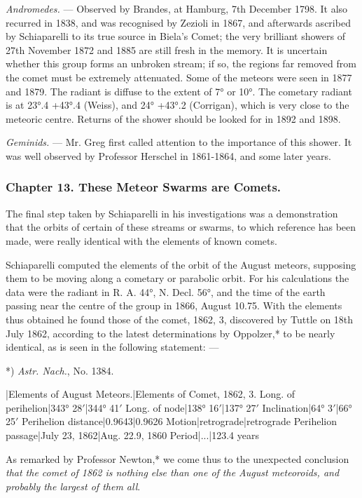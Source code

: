 \documentclass[a4paper, 12pt, oneside, polutonikogreek, english]{article}
\begin{document}
\emph{Andromedes.} --- Observed by Brandes, at Hamburg, 7th December 1798. It also recurred in 1838, and was recognised by Zezioli in 1867, and afterwards ascribed by Schiaparelli to its true source in Biela's Comet; the very brilliant showers of 27th November 1872 and 1885 are still fresh in the memory. It is uncertain whether this group forms an unbroken stream; if so, the regions far removed from the comet must be extremely attenuated. Some of the meteors were seen in 1877 and 1879. The radiant is diffuse to the extent of 7° or 10°. The cometary radiant is at 23°.4 +43°.4 (Weiss), and 24° +43°.2 (Corrigan), which is very close to the meteoric centre. Returns of the shower should be looked for in 1892 and 1898.

\emph{Geminids.} --- Mr. Greg first called attention to the importance of this shower. It was well observed by Professor Herschel in 1861-1864, and some later years.

\subsubsection{Chapter 13. These Meteor Swarms are Comets.}

The final step taken by Schiaparelli in his investigations was a demonstration that the orbits of certain of these streams or swarms, to which reference has been made, were really identical with the elements of known comets.

Schiaparelli computed the elements of the orbit of the August meteors, supposing them to be moving along a cometary or parabolic orbit. For his calculations the data were the radiant in R. A. 44°, N. Decl. 56°, and the time of the earth passing near the centre of the group in 1866, August 10.75. With the elements thus obtained he found those of the comet, 1862, 3, discovered by Tuttle on 18th July 1862, according to the latest determinations by Oppolzer,* to be nearly identical, as is seen in the following statement: ---

*) \emph{Astr. Nach.}, No. 1384.

|Elements of August Meteors.|Elements of Comet, 1862, 3. 
Long. of perihelion|343° 28$\prime$|344° 41$\prime$ 
Long. of node|138° 16$\prime$|137° 27$\prime$ 
Inclination|64° 3$\prime$|66° 25$\prime$ 
Perihelion distance|0.9643|0.9626 
Motion|retrograde|retrograde 
Perihelion passage|July 23, 1862|Aug. 22.9, 1860 
Period|...|123.4 years

As remarked by Professor Newton,* we come thus to the unexpected conclusion \emph{that the comet of 1862 is nothing else than one of the August meteoroids, and probably the largest of them all}.
\end{document}
